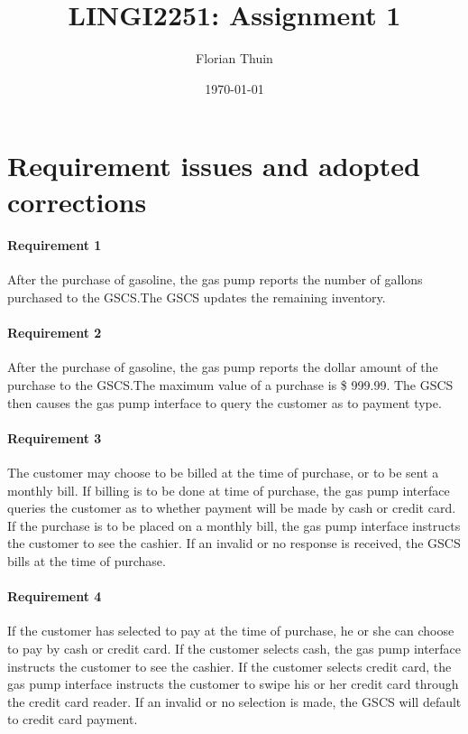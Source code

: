 \documentclass[11pt, a4paper]{article}
\title{LINGI2251: Assignment 1}
\author{Florian Thuin}
\date{\today}
\begin{document}
    \maketitle
    \tableofcontents

    \section{Requirement issues and adopted corrections}

    \paragraph{Requirement 1} After the purchase of gasoline, the gas pump
    reports the number of gallons purchased to the GSCS.\@ The GSCS updates the
    remaining inventory.

    \begin{framed}
    \end{framed}

    \paragraph{Requirement 2} After the purchase of gasoline, the gas pump
    reports the dollar amount of the purchase to the GSCS.\@ The maximum value of
    a purchase is \$ 999.99. The GSCS then causes the gas pump interface to
    query the customer as to payment type.

    \begin{framed}
    \end{framed}

    \paragraph{Requirement 3} The customer may choose to be billed at the time
    of purchase, or to be sent a monthly bill. If billing is to be done at time
    of purchase, the gas pump interface queries the customer as to whether
    payment will be made by cash or credit card. If the purchase is to be placed
    on a monthly bill, the gas pump interface instructs the customer to see the
    cashier. If an invalid or no response is received, the GSCS bills at the
    time of purchase.

    \begin{framed}
    \end{framed}

    \paragraph{Requirement 4} If the customer has selected to pay at the time of
    purchase, he or she can choose to pay by cash or credit card. If the
    customer selects cash, the gas pump interface instructs the customer to see
    the cashier. If the customer selects credit card, the gas pump interface
    instructs the customer to swipe his or her credit card through the credit
    card reader. If an invalid or no selection is made, the GSCS will default
    to credit card payment.
\end{document}
